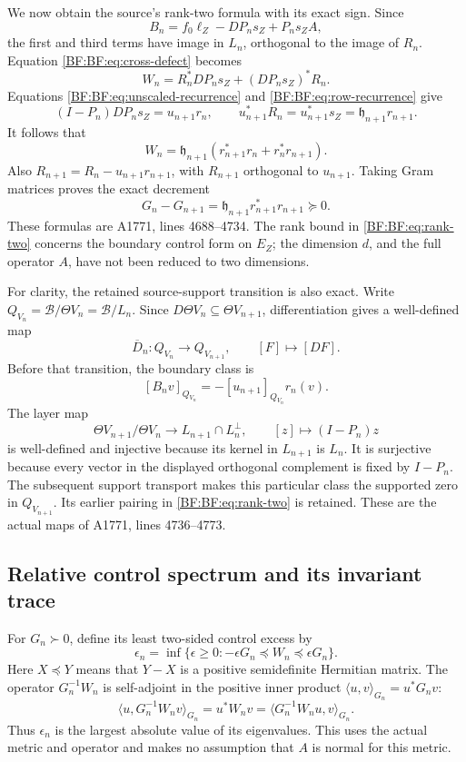 We now obtain the source's rank-two formula with its exact sign.
Since
\[
B_n=f_0\ell_Z-DP_ns_Z+P_ns_ZA,
\]
the first and third terms have image in \(L_n\), orthogonal to
the image of \(R_n\).  Equation \eqref{BF:BF:eq:cross-defect} becomes
\[
W_n=R_n^*DP_ns_Z+(DP_ns_Z)^*R_n.
\]
Equations \eqref{BF:BF:eq:unscaled-recurrence} and
\eqref{BF:BF:eq:row-recurrence} give
\[
(I-P_n)DP_ns_Z=u_{n+1}r_n,\qquad
u_{n+1}^*R_n=u_{n+1}^*s_Z
             =\mathfrak h_{n+1}r_{n+1}.
\]
It follows that
\begin{equation}
\boxed{\;
W_n=\mathfrak h_{n+1}
       \left(r_{n+1}^*r_n+r_n^*r_{n+1}\right).
\;}
\tag{BF.16}\label{BF:BF:eq:rank-two}
\end{equation}
Also \(R_{n+1}=R_n-u_{n+1}r_{n+1}\), with \(R_{n+1}\)
orthogonal to \(u_{n+1}\).  Taking Gram matrices proves the exact
decrement
\begin{equation}
G_n-G_{n+1}
 =\mathfrak h_{n+1}r_{n+1}^*r_{n+1}\succeq0.
\tag{BF.17}\label{BF:BF:eq:gram-decrement}
\end{equation}
These formulas are A1771, lines 4688--4734.  The rank bound in
\eqref{BF:BF:eq:rank-two} concerns the boundary control form on \(E_Z\);
the dimension \(d\), and the full operator \(A\), have not been
reduced to two dimensions.

For clarity, the retained source-support transition is also exact.
Write \(Q_{V_n}=\mathcal B/\Theta V_n=\mathcal B/L_n\).
Since \(D\Theta V_n\subseteq\Theta V_{n+1}\), differentiation gives
a well-defined map
\[
\overline D_n:Q_{V_n}\longrightarrow Q_{V_{n+1}},
\qquad [F]\longmapsto[DF].
\]
Before that transition, the boundary class is
\[
[B_nv]_{Q_{V_n}}=-[u_{n+1}]_{Q_{V_n}}r_n(v).
\]
The layer map
\[
\Theta V_{n+1}/\Theta V_n
\longrightarrow L_{n+1}\cap L_n^\perp,\qquad
[z]\longmapsto(I-P_n)z
\]
is well-defined and injective because its kernel in \(L_{n+1}\)
is \(L_n\).  It is surjective because every vector in the displayed
orthogonal complement is fixed by \(I-P_n\).
The subsequent support transport makes this particular class the
supported zero in \(Q_{V_{n+1}}\).  Its earlier pairing in
\eqref{BF:BF:eq:rank-two} is retained.  These are the actual maps of
A1771, lines 4736--4773.

\subsection{Relative control spectrum and its invariant trace}
\label{BF:BF:trace}

For \(G_n\succ0\), define its least two-sided control excess by
\begin{equation}
\epsilon_n=\inf\{\epsilon\ge0:
               -\epsilon G_n\preceq W_n\preceq\epsilon G_n\}.
\tag{BF.18}\label{BF:BF:eq:excess-definition}
\end{equation}
Here \(X\preceq Y\) means that \(Y-X\) is a positive semidefinite
Hermitian matrix.  The operator \(G_n^{-1}W_n\) is self-adjoint in
the positive inner product \(\langle u,v\rangle_{G_n}=u^*G_nv\):
\[
\langle u,G_n^{-1}W_nv\rangle_{G_n}=u^*W_nv
=\langle G_n^{-1}W_nu,v\rangle_{G_n}.
\]
Thus \(\epsilon_n\) is the largest absolute value of its eigenvalues.
This uses the actual metric and operator and makes no assumption that
\(A\) is normal for this metric.

